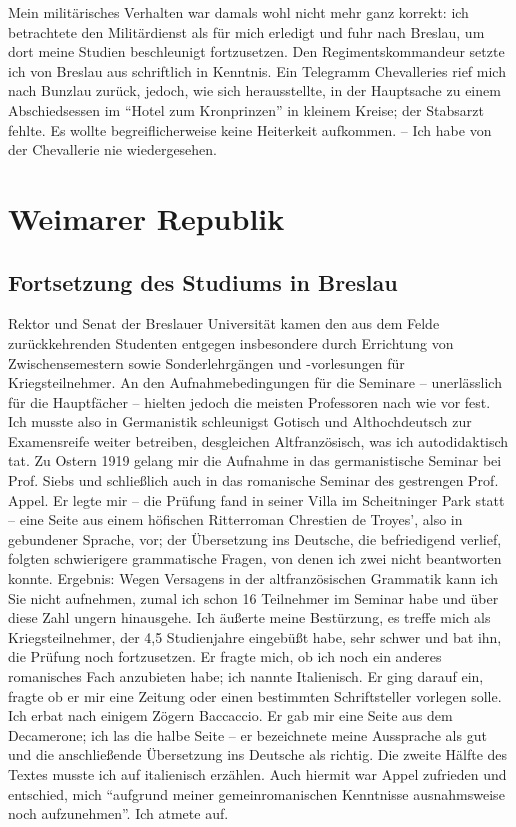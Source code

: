 \documentclass[a5paper,pagesize,10pt,twoside=true]{scrbook}
\begin{document}
Mein militärisches Verhalten war damals wohl nicht mehr ganz korrekt: ich betrachtete den Militärdienst als für mich erledigt und fuhr nach Breslau, um dort meine Studien beschleunigt fortzusetzen. Den Regimentskommandeur setzte ich von Breslau aus schriftlich in Kenntnis. Ein Telegramm Chevalleries rief mich nach Bunzlau zurück, jedoch, wie sich herausstellte, in der Hauptsache zu einem Abschiedsessen im \enquote{Hotel zum Kronprinzen} in kleinem Kreise; der Stabsarzt fehlte. Es wollte begreiflicherweise keine Heiterkeit aufkommen. -- Ich habe von der Chevallerie nie wiedergesehen.

\chapter{Weimarer Republik}
\section{Fortsetzung des Studiums in Breslau}
Rektor und Senat der Breslauer Universität kamen den aus dem Felde zurückkehrenden Studenten entgegen insbesondere durch Errichtung von Zwischensemestern sowie Sonderlehrgängen und -vorlesungen für Kriegsteilnehmer. An den Aufnahmebedingungen für die Seminare -- unerlässlich für die Hauptfächer -- hielten jedoch die meisten Professoren nach wie vor fest. Ich musste also in Germanistik schleunigst Gotisch und Althochdeutsch zur Examensreife weiter betreiben, desgleichen Altfranzösisch, was ich autodidaktisch tat. Zu Ostern 1919 gelang mir die Aufnahme in das germanistische Seminar bei Prof. Siebs und schließlich auch in das romanische Seminar des gestrengen Prof. Appel. Er legte mir -- die Prüfung fand in seiner Villa im Scheitninger Park statt -- eine Seite aus einem höfischen Ritterroman Chrestien de Troyes', also in gebundener Sprache, vor; der Übersetzung ins Deutsche, die befriedigend verlief, folgten schwierigere grammatische Fragen, von denen ich zwei nicht beantworten konnte. Ergebnis: Wegen Versagens in der altfranzösischen Grammatik kann ich Sie nicht aufnehmen, zumal ich schon 16 Teilnehmer im Seminar habe und über diese Zahl ungern hinausgehe. Ich äußerte meine Bestürzung, es treffe mich als Kriegsteilnehmer, der 4,5 Studienjahre eingebüßt habe, sehr schwer und bat ihn, die Prüfung noch fortzusetzen. Er fragte mich, ob ich noch ein anderes romanisches Fach anzubieten habe; ich nannte Italienisch. Er ging darauf ein, fragte ob er mir eine Zeitung oder einen bestimmten Schriftsteller vorlegen solle. Ich erbat nach einigem Zögern Baccaccio. Er gab mir eine Seite aus dem Decamerone; ich las die halbe Seite -- er bezeichnete meine Aussprache als gut und die anschließende Übersetzung ins Deutsche als richtig. Die zweite Hälfte des Textes musste ich auf italienisch erzählen. Auch hiermit war Appel zufrieden und entschied, mich \enquote{aufgrund meiner gemeinromanischen Kenntnisse ausnahmsweise noch aufzunehmen}. Ich atmete auf.
\end{document}
